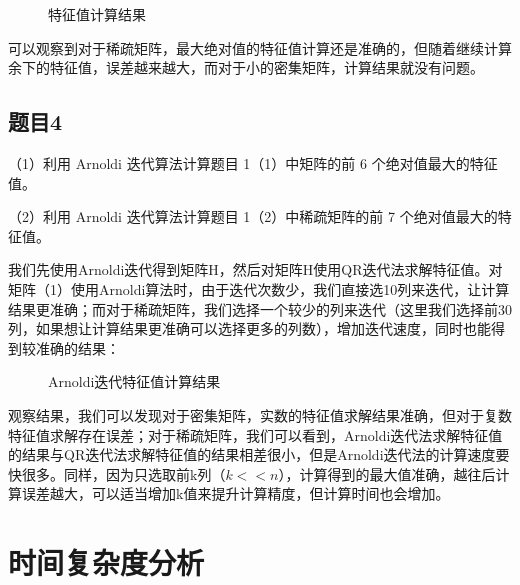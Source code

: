 \documentclass{source/Report}
\begin{document}
\begin{figure}[htbp]
  \centering
  \label{fig:subfig}
  \caption{特征值计算结果}
\end{figure}

可以观察到对于稀疏矩阵，最大绝对值的特征值计算还是准确的，但随着继续计算余下的特征值，误差越来越大，而对于小的密集矩阵，计算结果就没有问题。

\subsection{题目4}

（1）利用 Arnoldi 迭代算法计算题目 1（1）中矩阵的前 6 个绝对值最大的特征值。

（2）利用 Arnoldi 迭代算法计算题目 1（2）中稀疏矩阵的前 7 个绝对值最大的特征值。\\ \par

我们先使用Arnoldi迭代得到矩阵H，然后对矩阵H使用QR迭代法求解特征值。对矩阵（1）使用Arnoldi算法时，由于迭代次数少，我们直接选10列来迭代，让计算结果更准确；而对于稀疏矩阵，我们选择一个较少的列来迭代（这里我们选择前30列，如果想让计算结果更准确可以选择更多的列数），增加迭代速度，同时也能得到较准确的结果：

\begin{figure}[H]
  \centering
  \label{fig:subfig}
  \caption{Arnoldi迭代特征值计算结果}
\end{figure}

观察结果，我们可以发现对于密集矩阵，实数的特征值求解结果准确，但对于复数特征值求解存在误差；对于稀疏矩阵，我们可以看到，Arnoldi迭代法求解特征值的结果与QR迭代法求解特征值的结果相差很小，但是Arnoldi迭代法的计算速度要快很多。同样，因为只选取前k列（$k<<n$），计算得到的最大值准确，越往后计算误差越大，可以适当增加k值来提升计算精度，但计算时间也会增加。



\section{时间复杂度分析}
\end{document}
